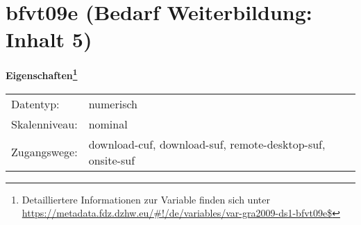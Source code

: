 
    \setcounter{footnote}{0}

    \vspace*{-1.8cm}
	\section{bfvt09e (Bedarf Weiterbildung: Inhalt 5)}
	\label{section:bfvt09e}



    \vspace*{0.5cm}
    \noindent\textbf{Eigenschaften\footnote{Detailliertere Informationen zur Variable finden sich unter
		\url{https://metadata.fdz.dzhw.eu/\#!/de/variables/var-gra2009-ds1-bfvt09e$}}}\\
	\begin{tabularx}{\hsize}{@{}lX}
	Datentyp: & numerisch \\
	Skalenniveau: & nominal \\
	Zugangswege: &
	  download-cuf, 
	  download-suf, 
	  remote-desktop-suf, 
	  onsite-suf
 \\
    \end{tabularx}



